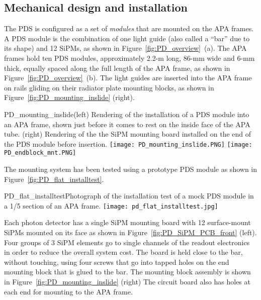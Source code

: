 \subsection{Mechanical design and installation}

The PDS is configured as a set of \textit{modules} that are mounted on the APA frames.  A PDS module is
the combination of one light guide (also called a ``bar'' due to its
shape) and 12 SiPMs, as shown in Figure~\ref{fig:PD_overview}~(a). 
The APA frames hold ten PDS modules, approximately 2.2-m long,
86-mm wide and 6-mm thick, equally spaced along the full length of the
APA frame, as shown in Figure~\ref{fig:PD_overview}~(b). 
The light guides are inserted into the APA frame on rails gliding on their radiator
plate mounting blocks, as shown in Figure~\ref{fig:PD_mounting_inslide} (right). 

\begin{cdrfigure}
  {PD_mounting_inslide}{(left) Rendering of the installation of a PDS module
    into an APA frame, shown just before it comes to rest on the inside face
    of the APA tube. (right) Rendering of the the SiPM mounting board
    installed on the end of the PDS module before insertion.}
\texttt{[image: PD\_mounting\_inslide.PNG]}
\texttt{[image: PD\_endblock\_mnt.PNG]}
\end{cdrfigure}

The mounting system has been tested using a prototype PDS module  
as shown in Figure~\ref{fig:PD_flat_installtest}.
\begin{cdrfigure}
  {PD_flat_installtest}{Photograph of the installation
    test of a mock PDS module in a 1/5 section of an APA frame.}
\texttt{[image: pd\_flat\_installtest.jpg]}
\end{cdrfigure}


Each photon detector has a single SiPM mounting board with 12 surface-mount SiPMs 
mounted on its face as shown in Figure~\ref{fig:PD_SiPM_PCB_front} (left).
Four groups of $3$ SiPM elements go to single 
channels of the readout electronics in order to reduce the overall system cost.
The board is held close to the bar, without touching, using four screws that go into 
tapped holes on the end mounting block that is glued to the bar.  
The mounting block assembly is shown in Figure~\ref{fig:PD_mounting_inslide} (right) %
The circuit board also has holes at each end for mounting to the APA frame.  

